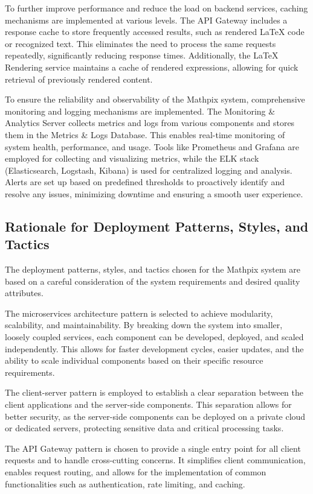 \documentclass{article}
\begin{document}
To further improve performance and reduce the load on backend services, caching mechanisms are implemented at various levels. The API Gateway includes a response cache to store frequently accessed results, such as rendered LaTeX code or recognized text. This eliminates the need to process the same requests repeatedly, significantly reducing response times. Additionally, the LaTeX Rendering service maintains a cache of rendered expressions, allowing for quick retrieval of previously rendered content.


To ensure the reliability and observability of the Mathpix system, comprehensive monitoring and logging mechanisms are implemented. The Monitoring \& Analytics Server collects metrics and logs from various components and stores them in the Metrics \& Logs Database. This enables real-time monitoring of system health, performance, and usage. Tools like Prometheus and Grafana are employed for collecting and visualizing metrics, while the ELK stack (Elasticsearch, Logstash, Kibana) is used for centralized logging and analysis. Alerts are set up based on predefined thresholds to proactively identify and resolve any issues, minimizing downtime and ensuring a smooth user experience.

\subsection{Rationale for Deployment Patterns, Styles, and Tactics}
The deployment patterns, styles, and tactics chosen for the Mathpix system are based on a careful consideration of the system requirements and desired quality attributes.

The microservices architecture pattern is selected to achieve modularity, scalability, and maintainability. By breaking down the system into smaller, loosely coupled services, each component can be developed, deployed, and scaled independently. This allows for faster development cycles, easier updates, and the ability to scale individual components based on their specific resource requirements.

The client-server pattern is employed to establish a clear separation between the client applications and the server-side components. This separation allows for better security, as the server-side components can be deployed on a private cloud or dedicated servers, protecting sensitive data and critical processing tasks.

The API Gateway pattern is chosen to provide a single entry point for all client requests and to handle cross-cutting concerns. It simplifies client communication, enables request routing, and allows for the implementation of common functionalities such as authentication, rate limiting, and caching.
\end{document}
